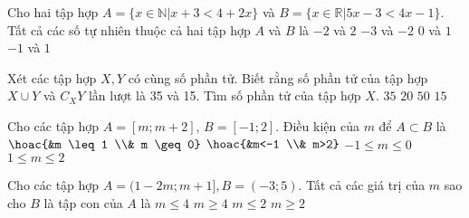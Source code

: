 \begin{ex}%
	Cho hai tập hợp $A=\lbrace x \in \mathbb{N}\big| x+3<4+2x \rbrace$ và $B= \lbrace x \in \mathbb{R} \big| 5x-3 < 4x-1  \rbrace$. Tất cả các số tự nhiên thuộc cả hai tập hợp $A$ và $B$ là
	\choice
	{$-2$ và $2$}
	{$-3$ và $-2$}
	{\True $0$ và $1$}
	{$-1$ và $1$}
\end{ex}

\begin{ex}%
	Xét các tập hợp $X, Y$ có cùng số phần tử. Biết rằng số phần tử của tập hợp $X \cup Y$ và $C_XY$ lần lượt là 35 và 15. Tìm số phần tử của tập hợp $X$.
	\choice
	{$35$}
	{\True $20$}
	{$50$}
	{$15$}
\end{ex}

\begin{ex}%
	Cho các tập hợp $A=[m;m+2]$, $B=[-1;2]$. Điều kiện của $m$ để $A \subset B$ là
	\choice
	{$\hoac{&m \leq 1 \\& m \geq 0}$}
	{$\hoac{&m<-1 \\& m>2}$}
	{\True $-1 \leq m \leq 0$}
	{$1 \leq m \leq 2$}
\end{ex}

\begin{ex}%
	Cho các tập hợp $A=(1-2m;m+1],B=(-3;5)$. Tất cả các giá trị của $m$ sao cho $B$ là tập con của $A$ là
	\choice
	{$m \leq 4$}
	{\True $m \geq 4$}
	{$m \leq 2$}
	{$m \geq 2$}
\end{ex}

